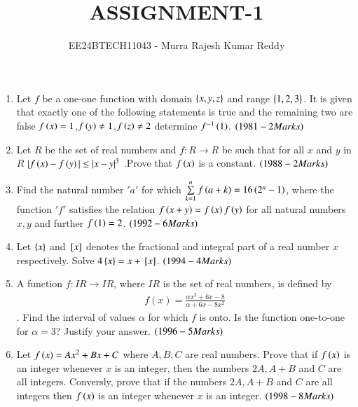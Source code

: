 \documentclass[journal,12pt,onecolumn,article]{IEEEtran}
\theoremstyle{remark}
\begin{document}

\vspace{4cm}
\title{ASSIGNMENT-1}
\author{EE24BTECH11043 - Murra Rajesh Kumar Reddy}
\maketitle
\bigskip
\begin{enumerate}
	\item Let $f$ be a one-one function with domain $\left\{x,y,z\right\}$ and range $\left\{1,2,3\right\}$. It is given that exactly one of the following statements is true and the remaining two are false ${f\left(x\right)=1}$,${f\left(y\right)\neq1}$,$f\left(z\right)\neq2$ determine $f^{-1}\left(1\right)$. \hfill$\left(1981 - 2 Marks\right)$
	\item Let $R$ be the set of real numbers and $f:R \to R$ be such that for all $x$ and $y$ in $R$ ${|f\left(x\right)-f\left(y\right)| \le |x-y|^3}$ .Prove that $f\left(x\right)$ is a constant. \hfill$\left(1988 - 2 Marks\right)$
	\item Find the natural number $'a'$ for which ${\sum\limits_{k=1}^nf\left(a+k\right)=16\left(2^n -1\right)}$, where the function $'f'$ satisfies the relation ${f\left(x+y\right)=f\left(x\right)f\left(y\right)}$ for all natural numbers $x, y$ and further ${f\left(1\right)=2}$. \hfill${\left(1992- 6 Marks\right)}$
	\item Let $\left\{x\right\}$ and ${}\left[x\right]$ denotes the fractional and integral part of a real number $x$ respectively. Solve $4\left\{x\right\}=x+{}\left[x\right]$. \hfill$\left(1994- 4 Marks\right)$
	\item A function $f:IR\to IR$, where $IR$ is the set of real numbers, is defined by
		\begin{align}
			{f(x)=\frac{\alpha x^2 +6x -8}{\alpha +6x-8x^2}}
		\end{align}
		. Find the interval of values $\alpha$ for which $f$ is onto. Is the function one-to-one for $\alpha=3$? Justify your answer. \hfill${\left(1996- 5 Marks\right)}$
	\item Let ${f\left(x\right)=Ax^2+Bx+C}$ where $A,B,C$ are real numbers. Prove that if $f\left(x\right)$ is an integer whenever $x$ is an integer, then the numbers $2A, A+B$ and $C$ are all integers. Conversly, prove that if the numbers $2A, A+B$ and $C$ are all integers then $f\left(x\right)$ is an integer whenever $x$ is an integer. \hfill${\left(1998- 8 Marks\right)}$ 
\end{enumerate}
\end{document}
